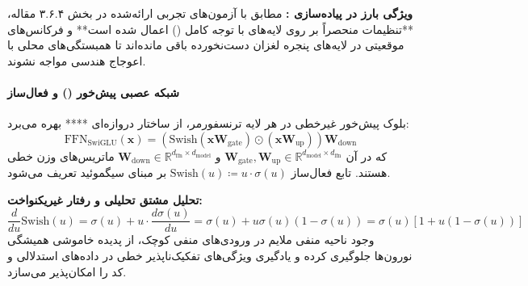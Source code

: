 \textbf{ویژگی بارز در پیاده‌سازی :}
مطابق با آزمون‌های تجربی ارائه‌شده در بخش ۳.۶.۴ مقاله، **تنظیمات  منحصراً بر روی لایه‌های با توجه کامل () اعمال شده است** و فرکانس‌های موقعیتی در لایه‌های پنجره لغزان دست‌نخورده باقی مانده‌اند تا همبستگی‌های محلی با اعوجاج هندسی مواجه نشوند.

\paragraph*{شبکه عصبی پیش‌خور () و فعال‌ساز }
بلوک پیش‌خور غیرخطی در هر لایه ترنسفورمر، از ساختار دروازه‌ای **** \cite{shazeer2020glu} بهره می‌برد:
\begin{equation}
    \text{FFN}_{\text{SwiGLU}}(\mathbf{x}) = \left( \text{Swish}(\mathbf{x} \mathbf{W}_{\text{gate}}) \odot (\mathbf{x} \mathbf{W}_{\text{up}}) \right) \mathbf{W}_{\text{down}}
\end{equation}
که در آن $\mathbf{W}_{\text{gate}}, \mathbf{W}_{\text{up}} \in \mathbb{R}^{d_{\text{model}} \times d_{\text{ffn}}}$ و $\mathbf{W}_{\text{down}} \in \mathbb{R}^{d_{\text{ffn}} \times d_{\text{model}}}$ ماتریس‌های وزن خطی هستند. تابع فعال‌ساز $\text{Swish}(u) \coloneqq u \cdot \sigma(u)$ بر مبنای سیگموئید تعریف می‌شود.

\textbf{تحلیل مشتق تحلیلی و رفتار غیریکنواخت:}
\begin{equation}
    \frac{d}{du}\text{Swish}(u) = \sigma(u) + u \cdot \frac{d\sigma(u)}{du} = \sigma(u) + u \sigma(u)(1 - \sigma(u)) = \sigma(u) \left[ 1 + u(1 - \sigma(u)) \right]
\end{equation}
وجود ناحیه منفی ملایم در ورودی‌های منفی کوچک، از پدیده خاموشی همیشگی نورون‌ها جلوگیری کرده و یادگیری ویژگی‌های تفکیک‌ناپذیر خطی در داده‌های استدلالی و کد را امکان‌پذیر می‌سازد.


